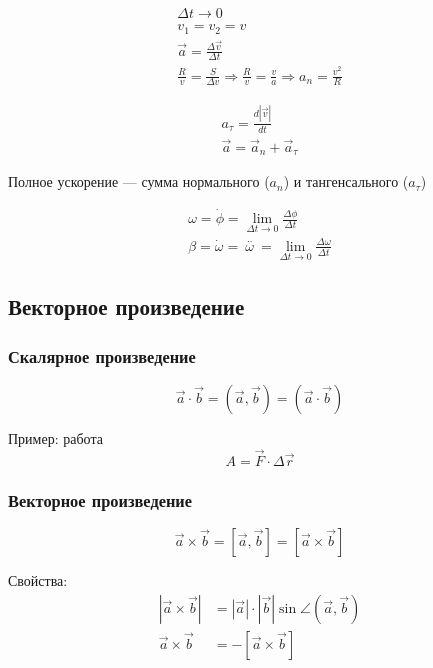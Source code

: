 \documentclass{article}
\begin{document}
\begin{gather*}
	\Delta t \to 0 \\
	v_1 = v_2 = v \\
	\vec{a} = \frac{\Delta \vec{v}}{\Delta t} \\
	\frac{R}{v} = \frac{S}{\Delta v} \Rightarrow \frac{R}{v} = \frac{v}{a} \Rightarrow a_n = \frac{v^2}{R}
\end{gather*}

\begin{gather*}
	a_\tau = \frac{d|\vec{v}|}{dt} \\
	\vec{a} = \vec{a}_n + \vec{a}_\tau
\end{gather*}

Полное ускорение --- сумма нормального ($a_n$) и тангенсального ($a_\tau$)

\begin{gather*}
	\omega = \dot{\phi} = \lim_{\Delta t \to 0} \frac{\Delta \phi}{\Delta t} \\
	\beta = \dot{\omega} =\ \stackrel{..}{\omega}\ = \lim_{\Delta t \to 0} \frac{\Delta \omega}{\Delta t}
\end{gather*}

\subsection{Векторное произведение}

\subsubsection*{Скалярное произведение}
\[ \vec{a} \cdot \vec{b} = (\vec{a}, \vec{b}) = (\vec{a} \cdot \vec{b}) \]

Пример: работа
\[ A = \vec{F} \cdot \Delta \vec{r} \]

\subsubsection*{Векторное произведение}
\[ \vec{a} \times \vec{b} = [\vec{a}, \vec{b}] = [\vec{a} \times \vec{b}] \]

Свойства:
\begin{align*}
	|\vec{a} \times \vec{b}| &= |\vec{a}| \cdot |\vec{b}| \sin \angle(\vec{a}, \vec{b}) \\
	\vec{a} \times \vec{b} &= -[\vec{a} \times \vec{b}]
\end{align*}
\end{document}
